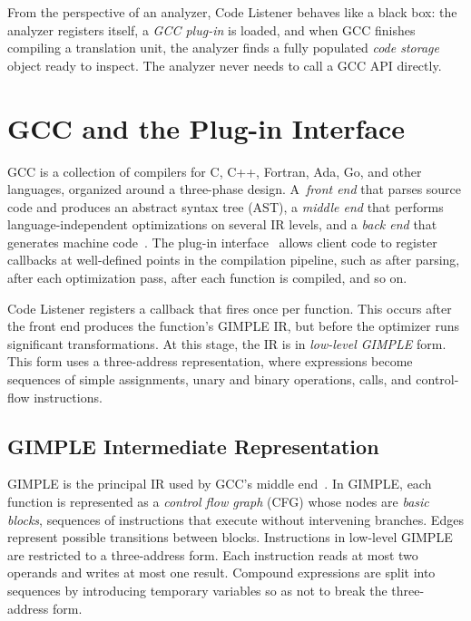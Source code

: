 From the perspective of an analyzer, Code Listener behaves like a black box: the analyzer registers itself, a \emph{GCC plug-in} is loaded, and when GCC finishes compiling a translation unit, the analyzer finds a fully populated \emph{code storage} object ready to inspect. The analyzer never needs to call a GCC API directly.

\section{GCC and the Plug-in Interface}
\label{sec:gcc-plugin}

GCC is a collection of compilers for C, C++, Fortran, Ada, Go, and other languages, organized around a three-phase design. A~\emph{front end} that parses source code and produces an abstract syntax tree (AST), a \emph{middle end} that performs language-independent optimizations on several IR levels, and a \emph{back end} that generates machine code~\cite{GCCInternals}. The plug-in interface~\cite{GCCPluginAPI} allows client code to register callbacks at well-defined points in the compilation pipeline, such as after parsing, after each optimization pass, after each function is compiled, and so on.

Code Listener registers a callback that fires once per function. This occurs after the front end produces the function's GIMPLE IR, but before the optimizer runs significant transformations. At this stage, the IR is in \emph{low-level GIMPLE} form. This form uses a three-address representation, where expressions become sequences of simple assignments, unary and binary operations, calls, and control-flow instructions.

\subsection{GIMPLE Intermediate Representation}
\label{sec:gimple}

GIMPLE is the principal IR used by GCC's middle end~\cite{GCCInternals}. In GIMPLE, each function is represented as a \emph{control flow graph} (CFG) whose nodes are \emph{basic blocks}, sequences of instructions that execute without intervening branches. Edges represent possible transitions between blocks. Instructions in low-level GIMPLE are restricted to a three-address form. Each instruction reads at most two operands and writes at most one result. Compound expressions are split into sequences by introducing temporary variables so as not to break the three-address form.

